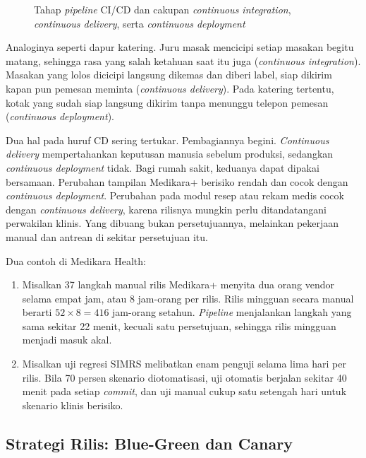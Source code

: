 \begin{figure}[!htb]
  \centering
  
  \caption{Tahap \textit{pipeline} CI/CD dan cakupan \textit{continuous integration},
           \textit{continuous delivery}, serta \textit{continuous deployment}}
  \label{fig:ch13-pipeline}
\end{figure}

Analoginya seperti dapur katering. Juru masak mencicipi setiap masakan begitu matang, sehingga
rasa yang salah ketahuan saat itu juga (\textit{continuous integration}). Masakan yang lolos
dicicipi langsung dikemas dan diberi label, siap dikirim kapan pun pemesan meminta
(\textit{continuous delivery}). Pada katering tertentu, kotak yang sudah siap langsung dikirim
tanpa menunggu telepon pemesan (\textit{continuous deployment}).

Dua hal pada huruf CD sering tertukar. Pembagiannya begini. \textit{Continuous delivery}
mempertahankan keputusan manusia sebelum produksi, sedangkan \textit{continuous deployment} tidak.
Bagi rumah sakit, keduanya dapat dipakai bersamaan. Perubahan tampilan Medikara+ berisiko rendah
dan cocok dengan \textit{continuous deployment}. Perubahan pada modul resep atau rekam medis cocok
dengan \textit{continuous delivery}, karena rilisnya mungkin perlu ditandatangani perwakilan
klinis. Yang dibuang bukan persetujuannya, melainkan pekerjaan manual dan antrean di sekitar
persetujuan itu.

Dua contoh di Medikara Health:
\begin{enumerate}
  \item Misalkan 37 langkah manual rilis Medikara+ menyita dua orang vendor selama empat jam, atau
        8 jam-orang per rilis. Rilis mingguan secara manual berarti $52 \times 8 = 416$ jam-orang
        setahun. \textit{Pipeline} menjalankan langkah yang sama sekitar 22 menit, kecuali satu
        persetujuan, sehingga rilis mingguan menjadi masuk akal.
  \item Misalkan uji regresi SIMRS melibatkan enam penguji selama lima hari per rilis. Bila 70
        persen skenario diotomatisasi, uji otomatis berjalan sekitar 40 menit pada setiap
        \textit{commit}, dan uji manual cukup satu setengah hari untuk skenario klinis berisiko.
\end{enumerate}

\subsection{Strategi Rilis: Blue-Green dan Canary}

